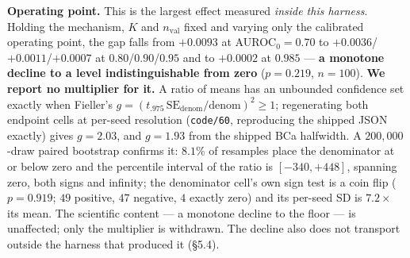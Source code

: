 \documentclass[10pt]{article} %
\begin{document}
\textbf{Operating point.} This is the largest effect measured \emph{inside this
harness}. Holding the mechanism, $K$ and $n_{\text{val}}$ fixed and varying only
the calibrated operating point, the gap falls from $+0.0093$ at
AUROC$_0=0.70$ to $+0.0036$/$+0.0011$/$+0.0007$ at $0.80$/$0.90$/$0.95$ and to
$+0.0002$ at $0.985$ --- \textbf{a monotone decline to a level indistinguishable
from zero} ($p=0.219$, $n=100$). \textbf{We report no multiplier for it.} A
ratio of means has an unbounded confidence set exactly when Fieller's
$g=(t_{.975}\,\mathrm{SE}_{\text{denom}}/\text{denom})^2\geq1$; regenerating
both endpoint cells at per-seed resolution (\texttt{code/60}, reproducing the
shipped JSON exactly) gives $g=2.03$, and $g=1.93$ from the shipped BCa
halfwidth. A $200{,}000$-draw paired bootstrap confirms it: $8.1\%$ of
resamples place the denominator at or below zero and the percentile interval of
the ratio is $[-340,+448]$, spanning zero, both signs and infinity; the
denominator cell's own sign test is a coin flip ($p=0.919$; $49$ positive, $47$
negative, $4$ exactly zero) and its per-seed SD is $7.2\times$ its mean. The
scientific content --- a monotone decline to the floor --- is unaffected; only
the multiplier is withdrawn. The decline also does not transport outside the
harness that produced it (§5.4).
\end{document}
